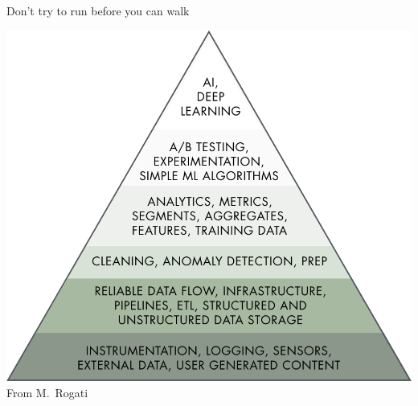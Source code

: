\documentclass[12pt,aspectratio=169]{beamer}
\begin{document}
\begin{frame}{Don't try to run before you can walk}
    \begin{center}
        \includegraphics[height=0.8\textheight]{figures/ai_hierarchy} \\
        {\scriptsize%
         From M.\ Rogati}
    \end{center}
\end{frame}
\end{document}
